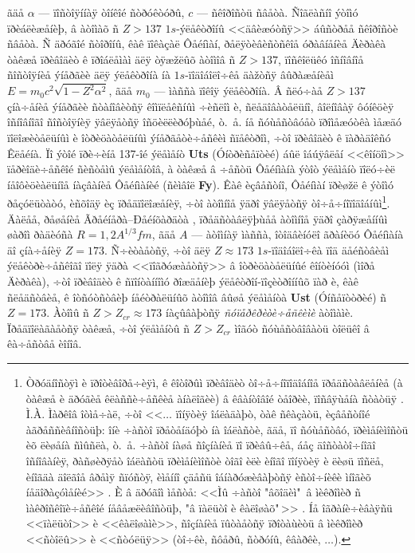 ãäå $\alpha$ --- ïîñòîÿííàÿ òîíêîé ñòðóêòóðû, $c$ --- ñêîðîñòü ñâåòà. Ñîãëàñíî ýòîìó ïðèáëèæåíèþ, â àòîìàõ ñ $Z>137$ $1s$-ýëåêòðîíû <<äâèæóòñÿ>> áûñòðåå ñêîðîñòè ñâåòà. Ñ äðóãîé ñòîðîíû, êàê ïîêàçàë Ôåéíìàí, ðåëÿòèâèñòñêîå óðàâíåíèå Äèðàêà òàêæå ïðèâîäèò ê ïðîáëåìàì äëÿ òÿæžëûõ àòîìîâ ñ $Z>137$, ïîñêîëüêó îñíîâíîå ñîñòîÿíèå ýíåðãèè äëÿ ýëåêòðîíà íà $1s$-ïîäîáîëî÷êå äàžòñÿ âûðàæåíèåì $E=m_0c^2\sqrt{1-Z^2\alpha^2}$, ãäå $m_0$ --- ìàññà ïîêîÿ ýëåêòðîíà. Â ñëó÷àå $Z>137$ çíà÷åíèå ýíåðãèè ñòàíîâèòñÿ êîìïëåêñíûì ÷èñëîì è, ñëåäîâàòåëüíî, âîëíîâàÿ ôóíêöèÿ îñíîâíîãî ñîñòîÿíèÿ ÿâëÿåòñÿ îñöèëëèðóþùåé, ò.~å. íå ñóùåñòâóåò ïðîìåæóòêà ìåæäó ïîëîæèòåëüíûì è îòðèöàòåëüíûì ýíåðãåòè÷åñêèì ñïåêòðîì, ÷òî ïðèâîäèò ê ïàðàäîêñó Êëåéíà. Ïî ýòîé ïðè÷èíå 137-îé ýëåìåíò \textbf{Uts} (Óíòðèñåïòèé) áûë îáúÿâëåí <<êîíöîì>> ïåðèîäè÷åñêîé ñèñòåìû ýëåìåíòîâ, à òàêæå â ÷åñòü Ôåéíìàíà ýòîò ýëåìåíò ïîëó÷èë íåîôèöèàëüíîå íàçâàíèå Ôåéíìàíèé (ñèìâîë \textbf{Fy}). Êàê èçâåñòíî, Ôåéíìàí ïðèøžë ê ýòîìó ðåçóëüòàòó, èñõîäÿ èç ïðåäïîëîæåíèÿ, ÷òî àòîìíîå ÿäðî ÿâëÿåòñÿ òî÷å÷íîïîäîáíûì\footnote{Òðóäíîñòÿì è ïðîòèâîðå÷èÿì, ê êîòîðûì ïðèâîäèò òî÷å÷íîïîäîáíîå ïðåäñòàâëåíèå (à òàêæå è äðóãèå êëàññè÷åñêèå àíàëîãèè) â êâàíòîâîé òåîðèè, ïîñâÿùåíà ñòàòüÿ \cite{Baez}. Ì.À. Ìàðêîâ îòìå÷àë, ÷òî <<$\ldots$ ïîíÿòèÿ îáëàäàþò, òàê ñêàçàòü, èçâåñòíîé àãðåññèâíîñòüþ: îíè ÷àñòî ïðåòåíäóþò íà îáëàñòè, ãäå, ïî ñóùåñòâó, ïðèìåíèìîñòü èõ ëèøåíà ñìûñëà, ò.~å. ÷àñòî íàøå ñîçíàíèå ïî ïðèâû÷êå, áåç äîñòàòî÷íîãî îñíîâàíèÿ, ðàñøèðÿåò îáëàñòü ïðèìåíèìîñòè òîãî èëè èíîãî ïîíÿòèÿ è ëèøü ïîñëå, èíîãäà äîëãîå âðåìÿ ñïóñòÿ, èìåííî çäåñü îáíàðóæèâàþòñÿ èñòî÷íèêè ìíîãèõ íåäîðàçóìåíèé>> \cite[c.~17]{Mark}. È â äðóãîì ìåñòå: <<Ìû ÷àñòî "âõîäèì"\ â ìèêðîìèð ñ ìàêðîñêîïè÷åñêîé íåâåæëèâîñòüþ, "â ïàëüòî è êàëîøàõ"\,>> \cite[c.~34]{Mark}. Íå îãðàíè÷èâàÿñü <<ïàëüòî>> è <<êàëîøàìè>>, ñîçíàíèå ïûòàåòñÿ ïðîòàùèòü â ìèêðîìèð <<ñòîëû>> è <<ñòóëüÿ>> (òî÷êè, ñôåðû, ñòðóíû, êâàðêè, $\ldots$).}. Äàëåå, ðåøåíèå Ãðåéíåðà--Ðåéíõàðäòà \cite{GR09}, ïðåäñòàâëÿþùåå àòîìíîå ÿäðî çàðÿæåííûì øàðîì ðàäèóñà $R=1{,}2A^{1/3}fm$, ãäå $A$ --- àòîìíàÿ ìàññà, îòîäâèíóëî ãðàíèöó Ôåéíìàíà äî çíà÷åíèÿ $Z=173$. Ñ÷èòàåòñÿ, ÷òî äëÿ $Z\approx 173$ $1s$-ïîäîáîëî÷êà ïîä äåéñòâèåì ýëåêòðè÷åñêîãî ïîëÿ ÿäðà <<ïîãðóæàåòñÿ>> â îòðèöàòåëüíûé êîíòèíóóì (ìîðå Äèðàêà), ÷òî ïðèâîäèò ê ñïîíòàííîìó ðîæäåíèþ ýëåêòðîí-ïîçèòðîííûõ ïàð è, êàê ñëåäñòâèå, ê îòñóòñòâèþ íåéòðàëüíûõ àòîìîâ âûøå ýëåìåíòà \textbf{Ust} (Óíñåïòòðèé) ñ $Z=173$. Àòîìû ñ $Z>Z_{cr}\approx 173$ íàçûâàþòñÿ \textit{ñóïåðêðèòè÷åñêèìè} àòîìàìè. Ïðåäïîëàãàåòñÿ òàêæå, ÷òî ýëåìåíòû ñ $Z>Z_{cr}$ ìîãóò ñóùåñòâîâàòü òîëüêî â êà÷åñòâå èîíîâ.


